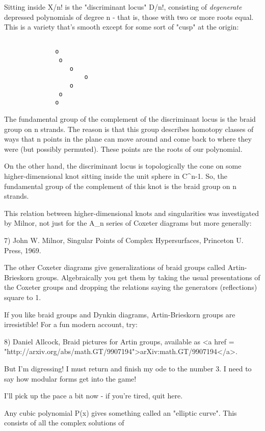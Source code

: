 Sitting inside X/n! is the "discriminant locus" D/n!, consisting
of \emph{degenerate} depressed polynomials of degree n - that is, those
with two or more roots equal.  This is a variety that's smooth except for 
some sort of "cusp" at the origin:


\begin{verbatim}

              o
               o
                  o
                      o
                  o
               o
              o
\end{verbatim}
    
The fundamental group of the complement of the discriminant locus
is the braid group on n strands.  The reason is that this group
describes homotopy classes of ways that n points in the plane can
move around and come back to where they were (but possibly permuted).
These points are the roots of our polynomial.

On the other hand, the discriminant locus is topologically the cone 
on some higher-dimensional knot sitting inside the unit sphere in 
C^{n-1}.  So, the fundamental group of the complement of this knot
is the braid group on n strands.

This relation between higher-dimensional knots and singularities 
was investigated by Milnor, not just for the A_{n} series of Coxeter 
diagrams but more generally:

7) John W. Milnor, Singular Points of Complex Hypersurfaces, 
Princeton U. Press, 1969.

The other Coxeter diagrams give generalizations of braid groups
called Artin-Brieskorn groups.  Algebraically you get them by taking
the usual presentations of the Coxeter groups and dropping the 
relations saying the generators (reflections) square to 1.  

If you like braid groups and Dynkin diagrams, Artin-Brieskorn groups 
are irresistible!  For a fun modern account, try:

8) Daniel Allcock, Braid pictures for Artin groups, available as
<a href = "http://arxiv.org/abs/math.GT/9907194">arXiv:math.GT/9907194</a>.

But I'm digressing!  I must return and finish my ode to the number 3.
I need to say how modular forms get into the game!

I'll pick up the pace a bit now - if you're tired, quit here.

Any cubic polynomial P(x) gives something called an "elliptic
curve".  This consists of all the complex solutions of

